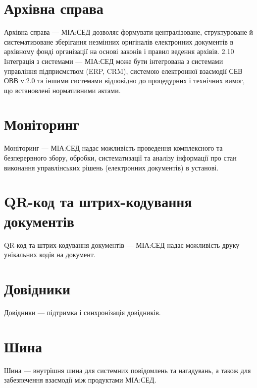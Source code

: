 \section{Архівна справа}

Архівна справа --- МІА:СЕД дозволяє формувати централізоване, структуроване
й систематизоване зберігання незмінних оригіналів електронних документів в
архівному фонді організації на основі законів і правил ведення архівів.
2.10 Інтеграція з системами --- МІА:СЕД може бути інтегрована з системами
управління підприємством (ERP, CRM), системою електронної взаємодії
СЕВ ОВВ v.2.0 та іншими системами відповідно до процедурних і технічних
вимог, що встановлені нормативними актами.

\section{Моніторинг}

Моніторинг --- МІА:СЕД надає можливість проведення комплексного та
безперервного збору, обробки, систематизації та аналізу інформації про стан
виконання управлінських рішень (електронних документів) в установі.

\section{QR-код та штрих-кодування документів}

QR-код та штрих-кодування документів --- МІА:СЕД надає можливість друку
унікальних кодів на документ.

\section{Довідники}

Довідники --- підтримка і синхронізація довідників.

\section{Шина}

Шина --- внутрішня шина для системних повідомлень та нагадувань, а також
для забезпечення взаємодії між продуктами МІА:СЕД.



